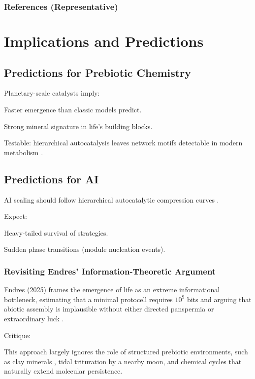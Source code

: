 \documentclass{book}
\begin{document}
\section{References (Representative)}
\citep{hazen2005}

\citep{england2013}

\citep{walker2013}

\citep{endres2025}

\part{Implications and Predictions}

\chapter{Predictions for Prebiotic Chemistry}
Planetary-scale catalysts imply:

Faster emergence than classic models predict.

Strong mineral signature in life’s building blocks.

Testable: hierarchical autocatalysis leaves network motifs detectable in modern metabolism \citep{bao2022}.

\chapter{Predictions for AI}
AI scaling should follow hierarchical autocatalytic compression curves \citep{scalinghypothesis}.

Expect:

Heavy-tailed survival of strategies.

Sudden phase transitions (module nucleation events).

\section{Revisiting Endres’ Information-Theoretic Argument}
Endres (2025) frames the emergence of life as an extreme informational bottleneck, estimating that a minimal protocell requires $10^9$ bits and arguing that abiotic assembly is implausible without either directed panspermia or extraordinary luck \citep{endres2025}.

Critique:

This approach largely ignores the role of structured prebiotic environments, such as clay minerals \citep{hazen2005}, tidal trituration by a nearby moon, and chemical cycles that naturally extend molecular persistence.
\end{document}
